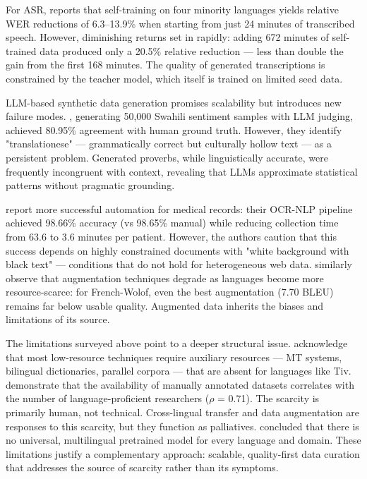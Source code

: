 \documentclass[11pt,a4paper]{article}
\begin{document}
For ASR, \citet{bartelds2023making} reports that self-training on four minority languages yields relative WER reductions of 6.3–13.9\% when starting from just 24 minutes of transcribed speech. However, diminishing returns set in rapidly: adding 672 minutes of self-trained data produced only a 20.5\% relative reduction — less than double the gain from the first 168 minutes. The quality of generated transcriptions is constrained by the teacher model, which itself is trained on limited seed data.

LLM-based synthetic data generation promises scalability but introduces new failure modes. \citet{gyamfi2026synthetic}, generating 50,000 Swahili sentiment samples with LLM judging, achieved 80.95\% agreement with human ground truth. However, they identify "translationese" — grammatically correct but culturally hollow text — as a persistent problem. Generated proverbs, while linguistically accurate, were frequently incongruent with context, revealing that LLMs approximate statistical patterns without pragmatic grounding.

\citet{Zhou2024} report more successful automation for medical records: their OCR-NLP pipeline achieved 98.66\% accuracy (vs 98.65\% manual) while reducing collection time from 63.6 to 3.6 minutes per patient. However, the authors caution that this success depends on highly constrained documents with "white background with black text" — conditions that do not hold for heterogeneous web data.\citet{oduwole2025scarcity} similarly observe that augmentation techniques degrade as languages become more resource-scarce: for French-Wolof, even the best augmentation (7.70 BLEU) remains far below usable quality. Augmented data inherits the biases and limitations of its source.

The limitations surveyed above point to a deeper structural issue. \citet{hedderich2021survey} acknowledge that most low-resource techniques require auxiliary resources — MT systems, bilingual dictionaries, parallel corpora — that are absent for languages like Tiv. \citet{yu2022beyond} demonstrate that the availability of manually annotated datasets correlates with the number of language-proficient researchers ($\rho$ = 0.71). The scarcity is primarily human, not technical. Cross-lingual transfer and data augmentation are responses to this scarcity, but they function as palliatives. \citet{garcia2025cross} concluded that there is no universal, multilingual pretrained model for every language and domain. These limitations justify a complementary approach: scalable, quality-first data curation that addresses the source of scarcity rather than its symptoms.
\end{document}

